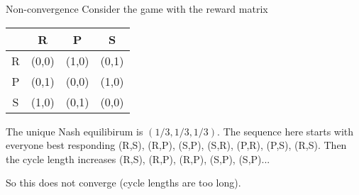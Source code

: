\begin{aexample}{Non-convergence}{}
    Consider the game with the reward matrix  \begin{center}
       
        \begin{tabular}{|c|c  c c|} 
            \hline &R & P & S\\
            
            \hline
            R&(0,0)&(1,0)&(0,1)\\
            \hline P&(0,1)&(0,0)&(1,0)\\
             \hline S&(1,0)&(0,1)&(0,0)
            \\ \hline
        \end{tabular}
        \end{center}
The unique Nash equilibirum is $(1/3,1/3,1/3)$.
The sequence here starts with everyone best responding (R,S), (R,P), (S,P), (S,R), (P,R), (P,S), (R,S). Then the cycle length increases (R,S), (R,P), (R,P), (S,P), (S,P)...

So this does not converge (cycle lengths are too long).
\end{aexample}
